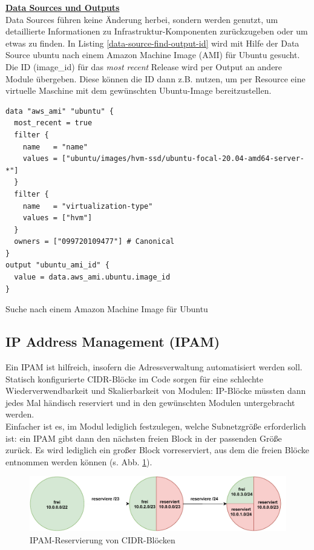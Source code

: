\textbf{\underline{Data Sources und Outputs}}\\
Data Sources führen keine Änderung herbei, sondern werden genutzt, um detaillierte Informationen zu Infrastruktur-Komponenten zurückzugeben oder um etwas zu finden. In Listing \ref{data-source-find-output-id} wird mit Hilfe der Data Source \glqq ubuntu\grqq{} nach einem Amazon Machine Image (AMI) für Ubuntu gesucht. Die ID (image\_id) für das \textit{most recent} Release wird per Output an andere Module übergeben. Diese können die ID dann z.B. nutzen, um per Resource eine virtuelle Maschine mit dem gewünschten Ubuntu-Image bereitzustellen.
\begin{listing}[h]
\begin{verbatim}
data "aws_ami" "ubuntu" {
  most_recent = true
  filter {
    name   = "name"
    values = ["ubuntu/images/hvm-ssd/ubuntu-focal-20.04-amd64-server-*"]
  }
  filter {
    name   = "virtualization-type"
    values = ["hvm"]
  }
  owners = ["099720109477"] # Canonical
}
output "ubuntu_ami_id" {
  value = data.aws_ami.ubuntu.image_id
}
\end{verbatim}
\caption{Suche nach einem Amazon Machine Image für Ubuntu}
\label{data-source-find-output-id}
\end{listing}\FloatBarrier
\subsection{IP Address Management (IPAM)}
Ein \gls{IPAM} ist hilfreich, insofern die Adressverwaltung automatisiert werden soll. Statisch konfigurierte \gls{CIDR}-Blöcke im Code sorgen für eine schlechte Wiederverwendbarkeit und Skalierbarkeit von Modulen: IP-Blöcke müssten dann jedes Mal händisch reserviert und in den gewünschten Modulen untergebracht werden.\\
Einfacher ist es, im Modul lediglich festzulegen, welche Subnetzgröße erforderlich ist: ein \gls{IPAM} gibt dann den nächsten freien Block in der passenden Größe zurück. Es wird lediglich ein großer Block vorreserviert, aus dem die freien Blöcke entnommen werden können (s. Abb. \ref{grafik: ipam_ip_reservation}).

\begin{figure}[h]
  \centering
  \includegraphics[scale=0.8]{Figures/ipam_cake.pdf}
  \caption{IPAM-Reservierung von CIDR-Blöcken}
  \label{grafik: ipam_ip_reservation}
\end{figure}\FloatBarrier
